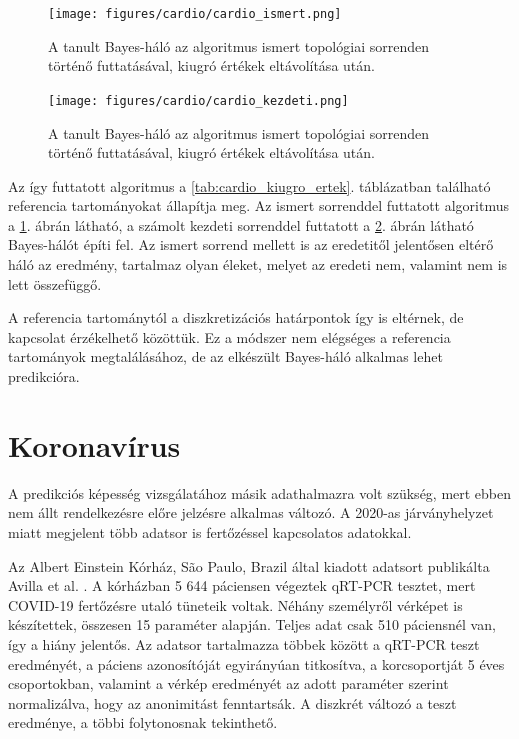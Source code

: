 \begin{figure}[htp]
    \centering
    \texttt{[image: figures/cardio/cardio\_ismert.png]}
    \caption{A tanult Bayes-háló az algoritmus ismert topológiai sorrenden történő futtatásával, kiugró értékek eltávolítása után.}
    \label{fig:cardio_kiugro_ertek}
\end{figure}

\begin{figure}[htp]
    \centering
    \texttt{[image: figures/cardio/cardio\_kezdeti.png]}
    \caption{A tanult Bayes-háló az algoritmus ismert topológiai sorrenden történő futtatásával, kiugró értékek eltávolítása után.}
    \label{fig:cardio_kiugro_ertek_kezdeti}
\end{figure}

Az így futtatott algoritmus a \ref{tab:cardio_kiugro_ertek}. táblázatban található referencia tartományokat állapítja meg. Az ismert sorrenddel futtatott algoritmus a \ref{fig:cardio_kiugro_ertek}. ábrán látható, a számolt kezdeti sorrenddel futtatott a \ref{fig:cardio_kiugro_ertek_kezdeti}. ábrán látható Bayes-hálót építi fel. Az ismert sorrend mellett is az eredetitől jelentősen eltérő háló az eredmény, tartalmaz olyan éleket, melyet az eredeti nem, valamint nem is lett összefüggő.

A referencia tartománytól a diszkretizációs határpontok így is eltérnek, de kapcsolat érzékelhető közöttük. Ez a módszer nem elégséges a referencia tartományok megtalálásához, de az elkészült Bayes-háló alkalmas lehet predikcióra.

\section{Koronavírus}
A predikciós képesség vizsgálatához másik adathalmazra volt szükség, mert ebben nem állt rendelkezésre előre jelzésre alkalmas változó. A 2020-as járványhelyzet miatt megjelent több adatsor is fertőzéssel kapcsolatos adatokkal.

Az Albert Einstein Kórház, São Paulo, Brazil által kiadott adatsort publikálta Avilla et al. \cite{avila2020hemogram}. A kórházban 5 644 páciensen végeztek qRT-PCR tesztet, mert COVID-19 fertőzésre utaló tüneteik voltak. Néhány személyről vérképet is készítettek, összesen 15 paraméter alapján. Teljes adat csak 510 páciensnél van, így a hiány jelentős. Az adatsor tartalmazza többek között a qRT-PCR teszt eredményét, a páciens azonosítóját egyirányúan titkosítva, a korcsoportját 5 éves csoportokban, valamint a vérkép eredményét az adott paraméter szerint normalizálva, hogy az anonimitást fenntartsák. A diszkrét változó a teszt eredménye, a többi folytonosnak tekinthető.

